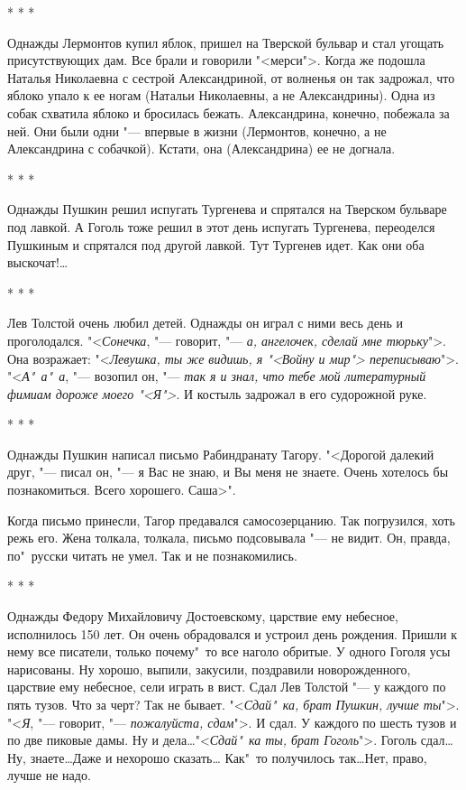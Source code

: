 \begin{center}
    * * *
\end{center}

    Однажды Лермонтов купил яблок, пришел на Тверской бульвар и
стал угощать присутствующих дам. Все брали и говорили  "<мерси">.
Когда же подошла Наталья Николаевна с сестрой Александриной, от
волненья  он так задрожал, что яблоко упало к ее ногам (Натальи
Николаевны, а не Александрины). Одна из собак схватила яблоко и
бросилась бежать. Александрина, конечно, побежала за  ней.  Они
были одни "--- впервые в жизни (Лермонтов, конечно, а не Александрина
с собачкой). Кстати, она (Александрина) ее не догнала.

\begin{center}
    * * *
\end{center}

    Однажды  Пушкин  решил  испугать  Тургенева  и спрятался на
Тверском бульваре под лавкой. А Гоголь тоже решил в  этот  день
испугать  Тургенева, переоделся Пушкиным и спрятался под другой
лавкой. Тут Тургенев идет. Как они оба выскочат!\dots

\begin{center}
    * * *
\end{center}

    Лев Толстой очень любил детей. Однажды он играл с ними весь
день и проголодался. "<\textit{Сонечка}, "--- говорит, "--- \textit{а, ангелочек,  сделай
мне тюрьку}">. Она возражает: "<\textit{Левушка, ты же видишь, я "<Войну
и  мир"> переписываю}">. "<\textit{А"~а"~а}, "--- возопил он, "--- \textit{так я и знал,
что тебе мой литературный фимиам дороже моего  "<Я">}.  И  костыль
задрожал в его судорожной руке.

\begin{center}
    * * *
\end{center}

    Однажды Пушкин написал письмо Рабиндранату Тагору. "<Дорогой
далекий друг, "--- писал он, "--- я Вас не знаю, и Вы меня не знаете.
Очень хотелось бы познакомиться. Всего хорошего. Саша>".

    Когда письмо принесли, Тагор предавался самосозерцанию. Так
погрузился, хоть режь его. Жена толкала, толкала, письмо подсовывала  
"--- не видит. Он, правда, по"~русски читать не умел. Так и
не познакомились.

\begin{center}
    * * *
\end{center}

    Однажды Федору Михайловичу Достоевскому, царствие  ему  небесное,  
исполнилось  150  лет.  Он очень обрадовался и устроил
день рождения. Пришли к нему все писатели, только почему"~то все
наголо обритые. У одного Гоголя усы нарисованы. Ну хорошо,  выпили,
закусили, поздравили новорожденного, царствие ему небесное,
сели играть в вист. Сдал Лев Толстой "--- у каждого  по  пять
тузов. Что за черт? Так не бывает. "<\textit{Сдай"~ка, брат Пушкин, лучше
ты}">.  "<\textit{Я},  "--- говорит, "--- \textit{пожалуйста, сдам}">. И сдал. У каждого по
шесть тузов и по две пиковые дамы. Ну и  дела\dots  "<\textit{Сдай"~ка  ты,
брат Гоголь}">. Гоголь сдал\dots Ну, знаете\dots Даже и нехорошо сказать\dots 
Как"~то получилось так\dots Нет, право, лучше не надо.


